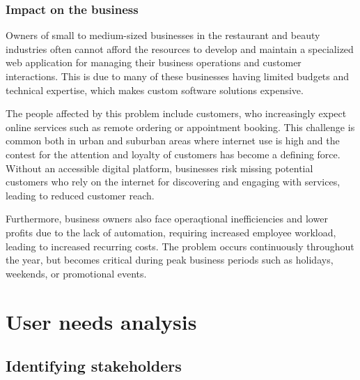 \documentclass[]{VUMIFTemplateClass}
\begin{document}



\subsubsection{Impact on the business}

Owners of small to medium-sized businesses in the restaurant and beauty
industries often cannot afford the resources to develop and maintain a
specialized web application for managing their business operations and customer
interactions. This is due to many of these businesses having limited budgets and
technical expertise, which makes custom software solutions expensive.

The people affected by this problem include customers, who increasingly expect
online services such as remote ordering or appointment booking. This challenge
is common both in urban and suburban areas where internet use is high and the
contest for the attention and loyalty of customers has become a defining force.
Without an accessible digital platform, businesses risk missing potential
customers who rely on the internet for discovering and engaging with services,
leading to reduced customer reach. 

Furthermore, business owners also face operaqtional inefficiencies and lower
profits due to the lack of automation, requiring increased employee workload,
leading to increased recurring costs. The problem occurs continuously throughout
the year, but becomes critical during peak business periods such as holidays,
weekends, or promotional events.

\section{User needs analysis}


\subsection{Identifying stakeholders}
\end{document}
